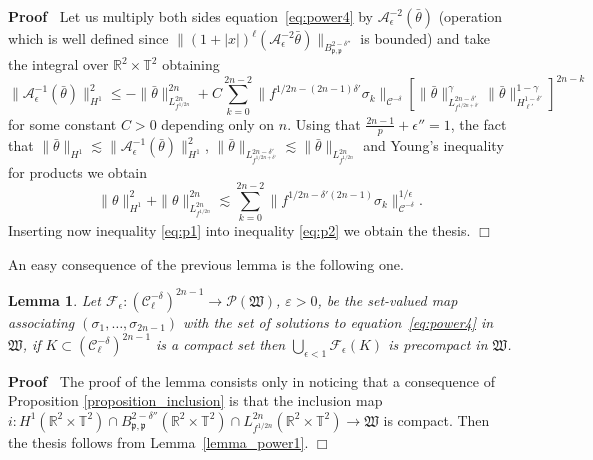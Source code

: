 \documentclass[a4paper,10pt]{article}
\newenvironment{proof}{\noindent\textbf{Proof\ }}{\hspace*{\fill}$\Box$\medskip}
\newtheorem{lemma}{Lemma}
\begin{document}
\begin{proof}
  Let us multiply both sides equation~{\eqref{eq:power4}} by
  $\mathcal{A}_{\epsilon}^{- 2} (\bar{\theta})$ (operation which is well
  defined since $\| (1 + | x |)^{\ell} (\mathcal{A}_{\epsilon}^{- 2}
  \bar{\theta}) \|_{B^{2 - \delta''}_{\mathfrak{p}, \mathfrak{p}}}$ is
  bounded) and take the integral over $\mathbb{R}^2 \times \mathbb{T}^2$
  obtaining
  \[ \| \mathcal{A}_{\epsilon}^{- 1} (\bar{\theta}) \|_{H^1}^2 \leqslant - \|
     \bar{\theta} \|_{L^{2 n}_{f^{1 / 2 n}}}^{2 n} + C \sum_{k = 0}^{2 n - 2}
     \| f^{1 / 2 n - (2 n - 1) \delta'} \sigma_k \|_{\mathcal{C}^{- \delta}}
     \left[ \| \bar{\theta} \|_{L^{2 n - \delta'}_{f^{1 / 2 n +
     \delta'}}}^{\gamma} \| \bar{\theta} \|^{1 - \gamma}_{H^{1 -
     \delta'}_{\ell'}} \right]^{2 n - k} \]
  for some constant $C > 0$ depending only on $n$. Using that $\frac{2 n -
  1}{p} + \epsilon'' = 1$, the fact that $\| \bar{\theta} \|_{H^1} \lesssim \|
  \mathcal{A}_{\epsilon}^{- 1} (\bar{\theta}) \|_{H^1}^2$, $\| \bar{\theta}
  \|_{L^{2 n - \delta'}_{f^{1 / 2 n + \delta'}}} \lesssim \| \bar{\theta}
  \|_{L^{2 n}_{f^{1 / 2 n}}}$ and Young's inequality for products we obtain
  \begin{equation}
    \| \mathcal{} \theta \|_{H^1}^2 + \| \theta \|_{L^{2 n}_{f^{1 / 2 n}}}^{2
    n} \lesssim \sum_{k = 0}^{2 n - 2} \| f^{1 / 2 n - \delta' (2 n - 1)}
    \sigma_k \|_{\mathcal{C}^{- \delta}}^{1 / \epsilon} . \label{eq:p1}
  \end{equation}
  Inserting now inequality {\eqref{eq:p1}} into inequality {\eqref{eq:p2}} we
  obtain the thesis.
\end{proof}

An easy consequence of the previous lemma is the following one.

\begin{lemma}
  \label{lemma_powercompact}Let $\mathcal{F}_{\epsilon} : (\mathcal{C}^{-
  \delta}_{\ell})^{2 n - 1} \rightarrow \mathcal{P} (\mathfrak{W})$,
  $\varepsilon > 0$, be the set-valued map associating $(\sigma_1, \ldots,
  \sigma_{2 n - 1})$ with the set of solutions to equation~{\eqref{eq:power4}}
  in $\mathfrak{W}$, if $K \subset (\mathcal{C}^{- \delta}_{\ell})^{2 n - 1}$
  is a compact set then $\bigcup_{\epsilon < 1} \mathcal{F}_{\epsilon} (K)$ is
  precompact in $\mathfrak{W}$.
\end{lemma}

\begin{proof}
  The proof of the lemma consists only in noticing that a consequence of
  Proposition \ref{proposition_inclusion} is that the inclusion map $i : H^1
  (\mathbb{R}^2 \times \mathbb{T}^2) \cap B^{2 - \delta''}_{\mathfrak{p},
  \mathfrak{p}} (\mathbb{R}^2 \times \mathbb{T}^2) \cap L^{2 n}_{f^{1 / 2 n}}
  (\mathbb{R}^2 \times \mathbb{T}^2) \rightarrow \mathfrak{W}$ is compact.
  Then the thesis follows from Lemma~\ref{lemma_power1}.
\end{proof}
\end{document}
